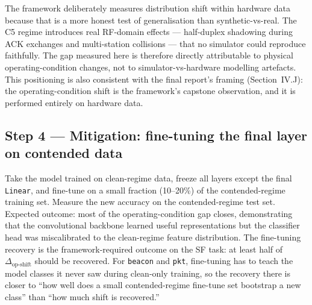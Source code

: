 \documentclass[11pt,letterpaper]{article}
\begin{document}
\begin{tcolorbox}[warning={Why On-Hardware Operating-Condition Shift, Not Sim-to-Real?}]
	The framework deliberately measures distribution shift within hardware data because that is a more honest test of generalisation than synthetic-vs-real. The C5 regime introduces real \mbox{RF}-domain effects --- half-duplex shadowing during \mbox{ACK} exchanges and multi-station collisions --- that no simulator could reproduce faithfully. The gap measured here is therefore directly attributable to physical operating-condition changes, not to simulator-vs-hardware modelling artefacts. This positioning is also consistent with the final report's framing (Section~IV.J): the operating-condition shift is the framework's capstone observation, and it is performed entirely on hardware data.
\end{tcolorbox}

\subsection{Step 4 --- Mitigation: fine-tuning the final layer on contended data}
Take the model trained on clean-regime data, freeze all layers except the final \texttt{Linear}, and fine-tune on a small fraction (10--20\%) of the contended-regime training set. Measure the new accuracy on the contended-regime test set. Expected outcome: most of the operating-condition gap closes, demonstrating that the convolutional backbone learned useful representations but the classifier head was miscalibrated to the clean-regime feature distribution. The fine-tuning recovery is the framework-required outcome on the SF task: at least half of $\Delta_{\text{op-shift}}$ should be recovered. For \texttt{beacon} and \texttt{pkt}, fine-tuning has to teach the model classes it never saw during clean-only training, so the recovery there is closer to ``how well does a small contended-regime fine-tune set bootstrap a new class'' than ``how much shift is recovered.''
\end{document}
